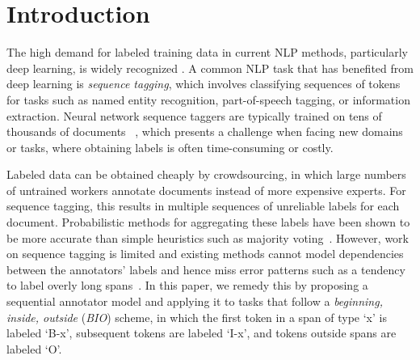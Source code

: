 \section{Introduction}\label{sec:intro}

The high demand for labeled training data in current NLP methods,
particularly deep learning, is widely recognized
\cite{zoph2016transfer, rastogi2016weighting, P14-1111}.
A common NLP task that has benefited from deep learning is \emph{sequence tagging},
which involves classifying sequences of tokens for tasks such as named entity recognition,
part-of-speech tagging, or information extraction. 
Neural network sequence taggers are typically trained on 
tens of thousands of documents %
~\cite{ma2016end,lample2016neural},
which presents a challenge 
when facing new domains or tasks, where obtaining labels is often time-consuming or costly.

Labeled data can be obtained cheaply by crowdsourcing, in which large
numbers of untrained workers annotate documents instead of more expensive experts.
For sequence tagging, this results in multiple sequences of unreliable labels for each document.
Probabilistic methods for aggregating these labels
have been shown to be more accurate than simple heuristics 
such as majority voting~\cite{Raykar2010,sheshadri2013square,rodrigues2013learning,hovy2013learning}.
However, work on sequence tagging is limited
and existing methods cannot model dependencies between the annotators' labels and hence 
miss error patterns such as a tendency to label overly long spans~\cite{rodrigues2014sequence,nguyen2017aggregating}.
In this paper, we remedy this by proposing a sequential annotator model and applying it to
 tasks that follow a \emph{beginning, inside, outside} (\emph{BIO})
 scheme, 
in which the first token in a span of type `x' is labeled `B-x',  
subsequent tokens are labeled `I-x', 
and tokens outside spans are labeled `O'.

